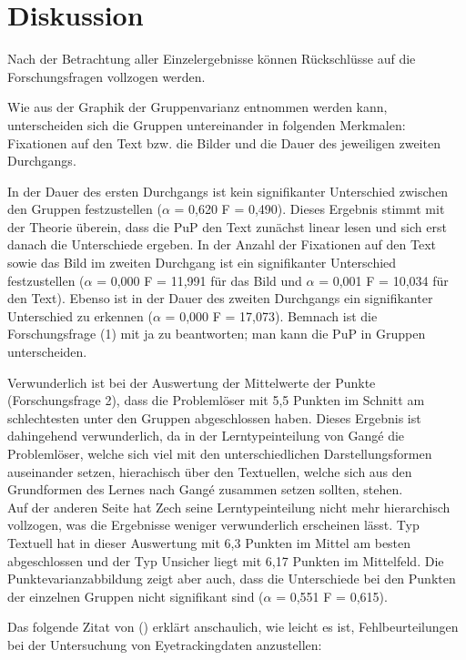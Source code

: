 \chapter{Diskussion}

Nach der Betrachtung aller Einzelergebnisse können Rückschlüsse auf die Forschungsfragen vollzogen werden.  

Wie aus der Graphik der Gruppenvarianz entnommen werden kann, unterscheiden sich die Gruppen untereinander in folgenden Merkmalen: Fixationen auf den Text bzw. die Bilder und die Dauer des jeweiligen zweiten Durchgangs.

In der Dauer des ersten Durchgangs ist kein signifikanter Unterschied zwischen den Gruppen festzustellen ($\alpha$ = 0,620 F = 0,490). Dieses Ergebnis stimmt mit der Theorie überein, dass die \gls{PuP} den Text zunächst linear lesen und sich erst danach die Unterschiede ergeben. In der Anzahl der Fixationen auf den Text sowie das Bild im zweiten Durchgang ist ein signifikanter Unterschied festzustellen ($\alpha$ = 0,000 F = 11,991 für das Bild und $\alpha$ = 0,001 F = 10,034 für den Text). Ebenso ist in der Dauer des zweiten Durchgangs ein signifikanter Unterschied zu erkennen ($\alpha$ = 0,000 F = 17,073). Bemnach ist die Forschungsfrage (1) mit ja zu beantworten; man kann die \gls{PuP} in Gruppen unterscheiden.

Verwunderlich ist bei der Auswertung der Mittelwerte der Punkte (Forschungsfrage 2), dass die Problemlöser mit 5,5 Punkten im Schnitt am schlechtesten unter den Gruppen abgeschlossen haben. Dieses Ergebnis ist dahingehend verwunderlich, da in der Lerntypeinteilung von Gangé die Problemlöser, welche sich viel mit den unterschiedlichen Darstellungsformen auseinander setzen, hierachisch über den Textuellen, welche sich aus den Grundformen des Lernes nach Gangé zusammen setzen sollten, stehen. \\
Auf der anderen Seite hat Zech seine Lerntypeinteilung nicht mehr hierarchisch vollzogen, was die Ergebnisse weniger verwunderlich erscheinen lässt. Typ Textuell hat in dieser Auswertung mit 6,3 Punkten im Mittel am besten abgeschlossen und der Typ Unsicher liegt mit 6,17 Punkten im Mittelfeld. Die Punktevarianzabbildung zeigt aber auch, dass die Unterschiede bei den Punkten der einzelnen Gruppen nicht signifikant sind ($\alpha$ = 0,551 F = 0,615). 

Das folgende Zitat von \citeauthor{hyrskykari2008gaze} () erklärt anschaulich, wie leicht es ist, Fehlbeurteilungen bei der Untersuchung von Eyetrackingdaten anzustellen:

